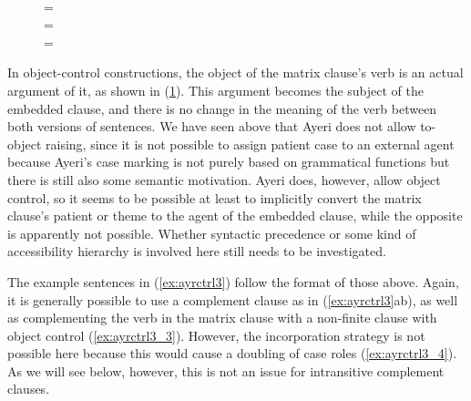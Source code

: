 \begin{figure}[h]
\pex\label{ex:engctrl2}
\a {}\\
	= 
\a {}\\
	= 
\a {}\\
	= 
\xe
\end{figure}

In object-control constructions, the object of the matrix clause's verb is an
actual argument of it, as shown in (\ref{ex:engctrl2}). This argument becomes
the subject of the embedded clause, and there is no change in the meaning of
the verb between both versions of sentences. We have seen above that Ayeri does
not allow to-object raising, since it is not possible to assign patient case to
an external agent because Ayeri's case marking is not purely based on
grammatical functions but there is still also some semantic motivation. Ayeri
does, however, allow object control, so it seems to be possible at least to
implicitly convert the matrix clause's patient or theme to the agent of the
embedded clause, while the opposite is apparently not possible. Whether
syntactic precedence or some kind of accessibility hierarchy is involved here
still needs to be investigated.

The example sentences in (\ref{ex:ayrctrl3}) follow the format of those above.
Again, it is generally possible to use a complement clause as in
(\ref{ex:ayrctrl3}ab), as well as complementing the verb in the matrix clause
with a non-finite clause with object control (\ref{ex:ayrctrl3_3}). However,
the incorporation strategy is not possible here because this would cause a
doubling of case roles (\ref{ex:ayrctrl3_4}). As we will see below, however,
this is not an issue for intransitive complement clauses.

